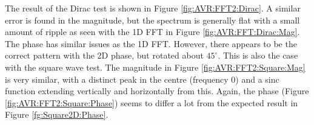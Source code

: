 The result of the Dirac test is shown in Figure \ref{fig:AVR:FFT2:Dirac}. A similar error is found in the magnitude, but the spectrum is generally flat with a small amount of ripple as seen with the 1D FFT in Figure \ref{fig:AVR:FFT:Dirac:Mag}. The phase has similar issues as the 1D FFT. However, there appears to be the correct pattern with the 2D phase, but rotated about $45^{\circ}$. This is also the case with the square wave test. The magnitude in Figure \ref{fig:AVR:FFT2:Square:Mag} is very similar, with a distinct peak in the centre (frequency 0) and a sinc function extending vertically and horizontally from this. Again, the phase (Figure \ref{fig:AVR:FFT2:Square:Phase}) seems to differ a lot from the expected result in Figure \ref{fg:Square2D:Phase}. 
\begin{figure}

\end{figure}
